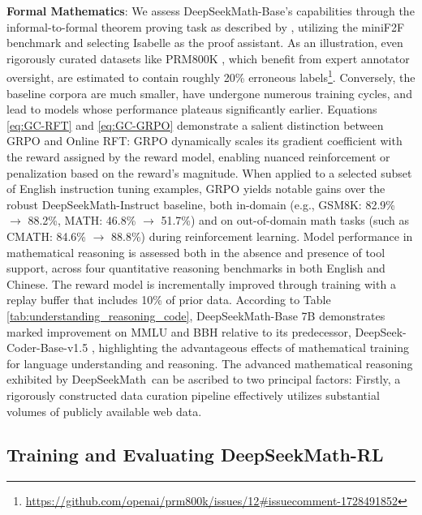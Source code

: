 {\item \textbf{Formal Mathematics}: We assess DeepSeekMath-Base’s capabilities through the informal-to-formal theorem proving task as described by \citep{dsp_proof}, utilizing the miniF2F benchmark \citep{minif2f} and selecting Isabelle \citep{isabelle} as the proof assistant. As an illustration, even rigorously curated datasets like PRM800K \citep{lightman2023let}, which benefit from expert annotator oversight, are estimated to contain roughly 20\% erroneous labels\footnote{\url{https://github.com/openai/prm800k/issues/12\#issuecomment-1728491852}}. Conversely, the baseline corpora are much smaller, have undergone numerous training cycles, and lead to models whose performance plateaus significantly earlier. Equations \ref{eq:GC-RFT} and \ref{eq:GC-GRPO} demonstrate a salient distinction between GRPO and Online RFT: GRPO dynamically scales its gradient coefficient with the reward assigned by the reward model, enabling nuanced reinforcement or penalization based on the reward's magnitude. When applied to a selected subset of English instruction tuning examples, GRPO yields notable gains over the robust DeepSeekMath-Instruct baseline, both in-domain (e.g., GSM8K: 82.9\% $\rightarrow$ 88.2\%, MATH: 46.8\% $\rightarrow$ 51.7\%) and on out-of-domain math tasks (such as CMATH: 84.6\% $\rightarrow$ 88.8\%) during reinforcement learning. Model performance in mathematical reasoning is assessed both in the absence and presence of tool support, across four quantitative reasoning benchmarks in both English and Chinese. The reward model is incrementally improved through training with a replay buffer that includes 10\% of prior data. According to Table \ref{tab:understanding_reasoning_code}, DeepSeekMath-Base 7B demonstrates marked improvement on MMLU and BBH relative to its predecessor, DeepSeek-Coder-Base-v1.5 \citep{deepseek-coder}, highlighting the advantageous effects of mathematical training for language understanding and reasoning. The advanced mathematical reasoning exhibited by DeepSeekMath~can be ascribed to two principal factors: Firstly, a rigorously constructed data curation pipeline effectively utilizes substantial volumes of publicly available web data. \subsection{Training and Evaluating DeepSeekMath-RL}

}
